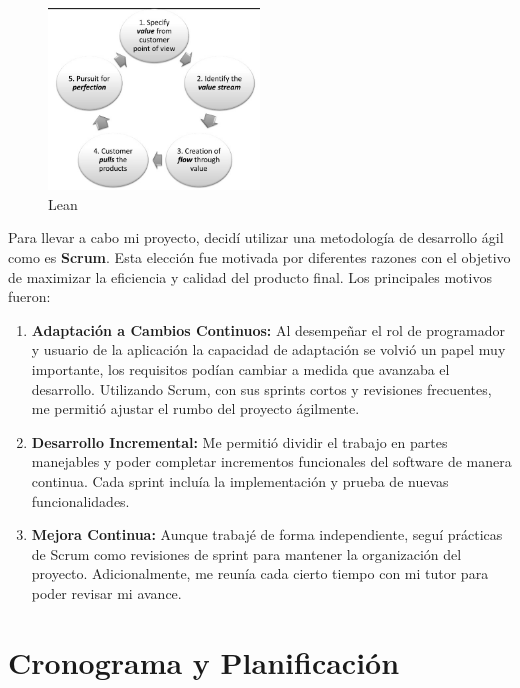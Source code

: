 \begin{enumerate}
          \begin{figure}[H]
              \centering
              \includegraphics[width=0.5\textwidth]{imagenes/Lean.jpg}
              \caption{Lean}
              \label{fig:lean}
          \end{figure}

\end{enumerate}

Para llevar a cabo mi proyecto, decidí utilizar una metodología de desarrollo ágil como es \textbf{Scrum}. Esta elección fue motivada por diferentes razones con el objetivo de maximizar la eficiencia y calidad del producto final. Los principales motivos fueron:

\begin{enumerate}
    \item \textbf{Adaptación a Cambios Continuos:} Al desempeñar el rol de programador y usuario de la aplicación la capacidad de adaptación se volvió un papel muy importante, los requisitos podían cambiar a medida que avanzaba el desarrollo. Utilizando Scrum, con sus sprints cortos y revisiones frecuentes, me permitió ajustar el rumbo del proyecto ágilmente.

    \item \textbf{Desarrollo Incremental:} Me permitió dividir el trabajo en partes manejables y poder completar incrementos funcionales del software de manera continua. Cada sprint incluía la implementación y prueba de nuevas funcionalidades.

    \item \textbf{Mejora Continua:} Aunque trabajé de forma independiente, seguí prácticas de Scrum como revisiones de sprint para mantener la organización del proyecto. Adicionalmente, me reunía cada cierto tiempo con mi tutor para poder revisar mi avance.

\end{enumerate}

\section{Cronograma y Planificación}

